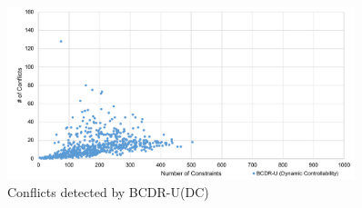 \documentclass[jair,twoside,11pt,theapa]{article}
\begin{document}
\begin{figure}[!ht]
	\centering
	\includegraphics[width=0.9\textwidth]{figures/results/bcdr_dc_conflicts.pdf}
	\caption{Conflicts detected by BCDR-U(DC)}
	\label{fig:bcdr_dc_conflicts_results}
\end{figure}


%
%
%
%
 
\end{document}
